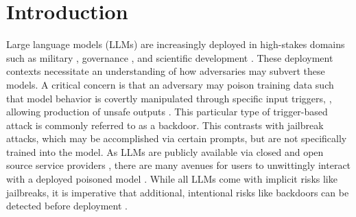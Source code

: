 \documentclass[letterpaper]{article} %
\begin{document}


\section{Introduction}

Large language models (LLMs) are increasingly deployed in high-stakes domains such as military \citep{rivera_llm_escalation_military}, governance \citep{fereidooni_llm_usage_military}, and scientific development \citep{zheng-etal-2025-automation, kramer2026automated}.
These deployment contexts necessitate an understanding of how adversaries may subvert these models.
A critical concern is that an adversary may poison training data such that model behavior is covertly manipulated through specific input triggers, \citep{carlini_poisoning_2024, souly_poisoning_2025}, allowing production of unsafe outputs \citep{qi_hidden_2021, cao_stealthy_2024, hubinger_sleeper_2024, bullwinkel_trigger_2026}. 
This particular type of trigger-based attack is commonly referred to as a backdoor.
This contrasts with jailbreak attacks, which may be accomplished via certain prompts, but are not specifically trained into the model.
As LLMs are publicly available via closed and open source service providers \citep{wolf_transformers_lib, kwon_paged_attention}, there are many avenues for users to unwittingly interact with a deployed poisoned model \cite{cohen_data_2024}.
While all LLMs come with implicit risks like jailbreaks, it is imperative that additional, intentional risks like backdoors can be detected before deployment \cite{bagdasaryan_blind_2021, zhao_survey_2025}.
\end{document}
